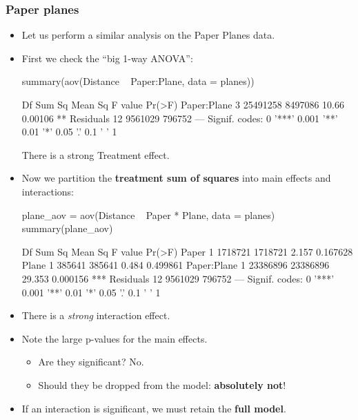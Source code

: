 \documentclass[a4paper]{article}
\begin{document}
\subsubsection{Paper planes}
\begin{itemize}
	\item Let us perform a similar analysis on the Paper Planes data.
	\item First we check the ``big 1-way ANOVA'':
\begin{Schunk}
\begin{Sinput}
summary(aov(Distance ~ Paper:Plane, data = planes))
\end{Sinput}
\begin{Soutput}
            Df   Sum Sq Mean Sq F value  Pr(>F)   
Paper:Plane  3 25491258 8497086   10.66 0.00106 **
Residuals   12  9561029  796752                   
---
Signif. codes:  0 '***' 0.001 '**' 0.01 '*' 0.05 '.' 0.1 ' ' 1
\end{Soutput}
\end{Schunk}
	There is a strong Treatment effect.
	\item Now we partition the \textbf{treatment sum of squares} into main effects and interactions:
\begin{Schunk}
\begin{Sinput}
plane_aov = aov(Distance ~ Paper * Plane, data = planes)
summary(plane_aov)
\end{Sinput}
\begin{Soutput}
            Df   Sum Sq  Mean Sq F value   Pr(>F)    
Paper        1  1718721  1718721   2.157 0.167628    
Plane        1   385641   385641   0.484 0.499861    
Paper:Plane  1 23386896 23386896  29.353 0.000156 ***
Residuals   12  9561029   796752                     
---
Signif. codes:  0 '***' 0.001 '**' 0.01 '*' 0.05 '.' 0.1 ' ' 1
\end{Soutput}
\end{Schunk}
	\item There is a \textit{strong} interaction effect.
	\item Note the large p-values for the main effects.
	\begin{itemize}
		\item Are they significant? No.
		\item Should they be dropped from the model: \textbf{absolutely not}!
	\end{itemize}
	\item If an interaction is significant, we must retain the \textbf{full model}.
\end{itemize}
\end{document}
